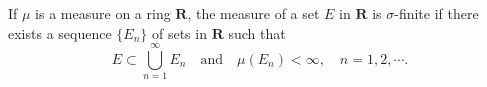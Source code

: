 If $\mu$ is a measure on a ring $\mathbf{R}$, the measure of a set $E$ in $\mathbf{R}$ is $\sigma$-finite if there exists a sequence $\{E_n\}$ of sets in $\mathbf{R}$ such that
$$E \subset \bigcup_{n=1}^{\infty} E_n \quad \text{and} \quad \mu(E_n) < \infty, \quad n = 1, 2, \cdots.$$
